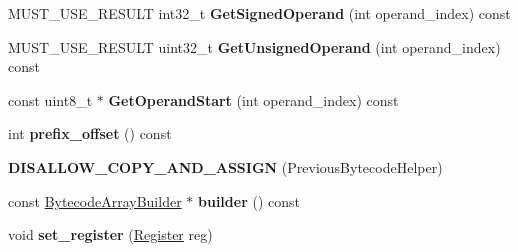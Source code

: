 \begin{DoxyCompactItemize}
\item 
M\+U\+S\+T\+\_\+\+U\+S\+E\+\_\+\+R\+E\+S\+U\+LT int32\+\_\+t {\bfseries Get\+Signed\+Operand} (int operand\+\_\+index) const \hypertarget{classv8_1_1internal_1_1interpreter_1_1_b_a_s_e___e_m_b_e_d_d_e_d_a4c2fc9032b8493560398999b21edcc16}{}\label{classv8_1_1internal_1_1interpreter_1_1_b_a_s_e___e_m_b_e_d_d_e_d_a4c2fc9032b8493560398999b21edcc16}

\item 
M\+U\+S\+T\+\_\+\+U\+S\+E\+\_\+\+R\+E\+S\+U\+LT uint32\+\_\+t {\bfseries Get\+Unsigned\+Operand} (int operand\+\_\+index) const \hypertarget{classv8_1_1internal_1_1interpreter_1_1_b_a_s_e___e_m_b_e_d_d_e_d_a9edf1fe8385eec9de0fc5771a347eb9e}{}\label{classv8_1_1internal_1_1interpreter_1_1_b_a_s_e___e_m_b_e_d_d_e_d_a9edf1fe8385eec9de0fc5771a347eb9e}

\item 
const uint8\+\_\+t $\ast$ {\bfseries Get\+Operand\+Start} (int operand\+\_\+index) const \hypertarget{classv8_1_1internal_1_1interpreter_1_1_b_a_s_e___e_m_b_e_d_d_e_d_a29085383f52fcc6722ae69b2afca99c5}{}\label{classv8_1_1internal_1_1interpreter_1_1_b_a_s_e___e_m_b_e_d_d_e_d_a29085383f52fcc6722ae69b2afca99c5}

\item 
int {\bfseries prefix\+\_\+offset} () const \hypertarget{classv8_1_1internal_1_1interpreter_1_1_b_a_s_e___e_m_b_e_d_d_e_d_a104e2be18d057d6cbf2a2cf316ec1641}{}\label{classv8_1_1internal_1_1interpreter_1_1_b_a_s_e___e_m_b_e_d_d_e_d_a104e2be18d057d6cbf2a2cf316ec1641}

\item 
{\bfseries D\+I\+S\+A\+L\+L\+O\+W\+\_\+\+C\+O\+P\+Y\+\_\+\+A\+N\+D\+\_\+\+A\+S\+S\+I\+GN} (Previous\+Bytecode\+Helper)\hypertarget{classv8_1_1internal_1_1interpreter_1_1_b_a_s_e___e_m_b_e_d_d_e_d_a90300800858d53fd38f38bdff0c6aaac}{}\label{classv8_1_1internal_1_1interpreter_1_1_b_a_s_e___e_m_b_e_d_d_e_d_a90300800858d53fd38f38bdff0c6aaac}

\item 
const \hyperlink{classv8_1_1internal_1_1interpreter_1_1_bytecode_array_builder}{Bytecode\+Array\+Builder} $\ast$ {\bfseries builder} () const \hypertarget{classv8_1_1internal_1_1interpreter_1_1_b_a_s_e___e_m_b_e_d_d_e_d_a5e50d71e854d41ce5f97bffe216fdced}{}\label{classv8_1_1internal_1_1interpreter_1_1_b_a_s_e___e_m_b_e_d_d_e_d_a5e50d71e854d41ce5f97bffe216fdced}

\item 
void {\bfseries set\+\_\+register} (\hyperlink{classv8_1_1internal_1_1interpreter_1_1_register}{Register} reg)\hypertarget{classv8_1_1internal_1_1interpreter_1_1_b_a_s_e___e_m_b_e_d_d_e_d_a91589716768ac370d92aad4141543a42}{}\label{classv8_1_1internal_1_1interpreter_1_1_b_a_s_e___e_m_b_e_d_d_e_d_a91589716768ac370d92aad4141543a42}


\end{DoxyCompactItemize}
